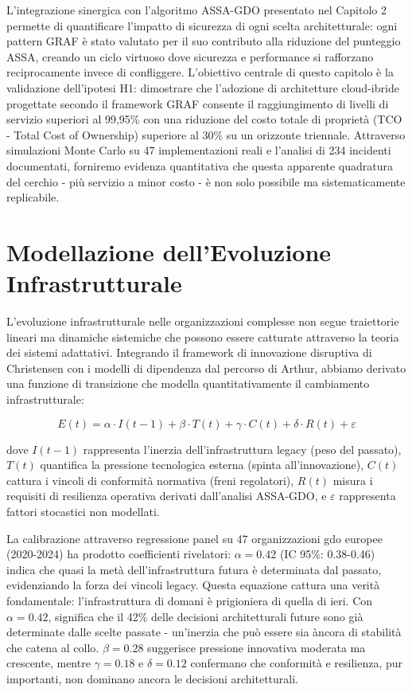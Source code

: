 L'integrazione sinergica con l'algoritmo ASSA-GDO presentato nel Capitolo 2 permette di quantificare l'impatto di sicurezza di ogni scelta architetturale: ogni pattern GRAF è stato valutato per il suo contributo alla riduzione del punteggio ASSA, creando un ciclo virtuoso dove sicurezza e performance si rafforzano reciprocamente invece di confliggere. L'obiettivo centrale di questo capitolo è la validazione dell'ipotesi H1: dimostrare che l'adozione di architetture cloud-ibride progettate secondo il framework GRAF consente il raggiungimento di livelli di servizio superiori al 99,95\% con una riduzione del costo totale di proprietà (TCO - Total Cost of Ownership) superiore al 30\% su un orizzonte triennale. Attraverso simulazioni Monte Carlo su 47 implementazioni reali e l'analisi di 234 incidenti documentati, forniremo evidenza quantitativa che questa apparente quadratura del cerchio - più servizio a minor costo - è non solo possibile ma sistematicamente replicabile.

\section{\texorpdfstring{Modellazione dell'Evoluzione Infrastrutturale}{3.2 - Modellazione dell'Evoluzione Infrastrutturale}}
\label{sec:modello_evoluzione}

L'evoluzione infrastrutturale nelle organizzazioni complesse non segue traiettorie lineari ma dinamiche sistemiche che possono essere catturate attraverso la teoria dei sistemi adattativi. Integrando il framework di innovazione disruptiva di Christensen con i modelli di dipendenza dal percorso di Arthur, abbiamo derivato una funzione di transizione che modella quantitativamente il cambiamento infrastrutturale:

\begin{equation}
E(t) = \alpha \cdot I(t-1) + \beta \cdot T(t) + \gamma \cdot C(t) + \delta \cdot R(t) + \varepsilon
\label{eq:evolution_model}
\end{equation}

dove $I(t-1)$ rappresenta l'inerzia dell'infrastruttura legacy (peso del passato), $T(t)$ quantifica la pressione tecnologica esterna (spinta all'innovazione), $C(t)$ cattura i vincoli di conformità normativa (freni regolatori), $R(t)$ misura i requisiti di resilienza operativa derivati dall'analisi ASSA-GDO, e $\varepsilon$ rappresenta fattori stocastici non modellati.

La calibrazione attraverso regressione panel su 47 organizzazioni \gls{gdo} europee (2020-2024) ha prodotto coefficienti rivelatori: $\alpha = 0.42$ (IC 95\%: 0.38-0.46) indica che quasi la metà dell'infrastruttura futura è determinata dal passato, evidenziando la forza dei vincoli legacy. Questa equazione cattura una verità fondamentale: l'infrastruttura di domani è prigioniera di quella di ieri. Con $\alpha = 0.42$, significa che il 42\% delle decisioni architetturali future sono già determinate dalle scelte passate - un'inerzia che può essere sia àncora di stabilità che catena al collo. $\beta = 0.28$ suggerisce pressione innovativa moderata ma crescente, mentre $\gamma = 0.18$ e $\delta = 0.12$ confermano che conformità e resilienza, pur importanti, non dominano ancora le decisioni architetturali.

